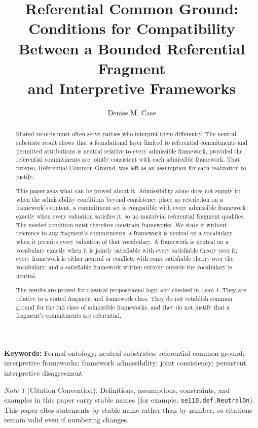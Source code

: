 \documentclass[11pt]{article}
\title{
Referential Common Ground:\\
Conditions for Compatibility Between a Bounded Referential Fragment\\
and Interpretive Frameworks
}
\author{Denise M. Case}
\affil{\small Department of Computer Science and Information Systems\\
Northwest Missouri State University, Maryville, MO, USA\\}
\date{}
\theoremstyle{plain}
\theoremstyle{definition}
\theoremstyle{remark}
\newtheorem*{note*}{Note}
\providecommand{\keywords}[1]{\vspace{0.5em}\noindent\textbf{Keywords: }\small #1}
\begin{document}
\maketitle
\vspace{-2em}

\begin{abstract}
  Shared records must often serve parties who interpret them differently.
  The neutral-substrate result shows that a foundational layer limited to
  referential commitments and permitted attributions is neutral relative to
  every admissible framework, provided the referential commitments are jointly
  consistent with each admissible framework.
  That proviso, Referential Common Ground, was left as an assumption for each
  realization to justify.

  This paper asks what can be proved about it.
  Admissibility alone does not supply it: when the admissibility conditions
  beyond consistency place no restriction on a framework's content, a
  commitment set is compatible with every admissible framework exactly when
  every valuation satisfies it, so no nontrivial referential fragment
  qualifies.
  The needed condition must therefore constrain frameworks.
  We state it without reference to any fragment's commitments: a framework is
  neutral on a vocabulary when it permits every valuation of that vocabulary.
  A framework is neutral on a vocabulary exactly when it is jointly satisfiable
  with every satisfiable theory over it; every framework is either neutral or
  conflicts with some satisfiable theory over the vocabulary; and a satisfiable
  framework written entirely outside the vocabulary is neutral.

  The results are proved for classical propositional logic and checked in
  Lean 4.
  They are relative to a stated fragment and framework class.
  They do not establish common ground for the full class of admissible
  frameworks, and they do not justify that a fragment's commitments are
  referential.
\end{abstract}


\keywords{
  Formal ontology;
  neutral substrates;
  referential common ground;
  interpretive frameworks;
  framework admissibility;
  joint consistency;
  persistent interpretive disagreement
}

\begin{note*}[Citation Convention]
  Definitions, assumptions, constraints, and examples in this paper carry stable
  names (for example, \texttt{se110.def.NeutralOn}).
  This paper cites statements by stable name rather than by number,
  so citations remain valid even if numbering changes.
\end{note*}
\end{document}
